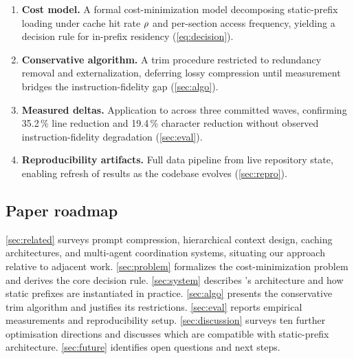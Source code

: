 \begin{enumerate}
  \item \textbf{Cost model.} A formal cost-minimization model decomposing
    static-prefix loading under cache hit rate $\rho$ and per-section
    access frequency, yielding a decision rule for in-prefix residency
    (\cref{eq:decision}).
  \item \textbf{Conservative algorithm.} A trim procedure restricted to
    redundancy removal and externalization, deferring lossy compression
    until measurement bridges the instruction-fidelity gap (\cref{sec:algo}).
  \item \textbf{Measured deltas.} Application to \blackrim across three
    committed waves, confirming 35.2\,\% line reduction and 19.4\,\%
    character reduction without observed instruction-fidelity degradation
    (\cref{sec:eval}).
  \item \textbf{Reproducibility artifacts.} Full data pipeline from live
    repository state, enabling refresh of results as the codebase evolves
    (\cref{sec:repro}).
\end{enumerate}

\subsection*{Paper roadmap}

\cref{sec:related} surveys prompt compression, hierarchical context design,
caching architectures, and multi-agent coordination systems, situating our
approach relative to adjacent work. \cref{sec:problem} formalizes the
cost-minimization problem and derives the core decision rule. \cref{sec:system}
describes \blackrim's architecture and how static prefixes are instantiated in
practice. \cref{sec:algo} presents the conservative trim algorithm and
justifies its restrictions. \cref{sec:eval} reports empirical measurements
and reproducibility setup. \cref{sec:discussion} surveys ten further
optimisation directions and discusses which are compatible with static-prefix
architecture. \cref{sec:future} identifies open questions and next steps.

